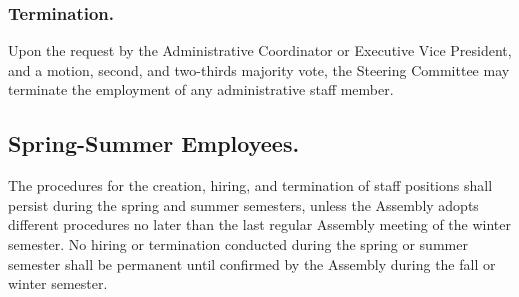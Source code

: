 \subsubsection{Termination.}  Upon the request by the Administrative Coordinator or Executive Vice President, and a motion, second, and two-thirds majority vote, the Steering Committee may terminate the employment of any administrative staff member.


\subsection{Spring-Summer Employees.}  The procedures for the creation, hiring, and termination of staff positions shall persist during the spring and summer semesters, unless the Assembly adopts different procedures no later than the last regular Assembly meeting of the winter semester.  No hiring or termination conducted during the spring or summer semester shall be permanent until confirmed by the Assembly during the fall or winter semester.
